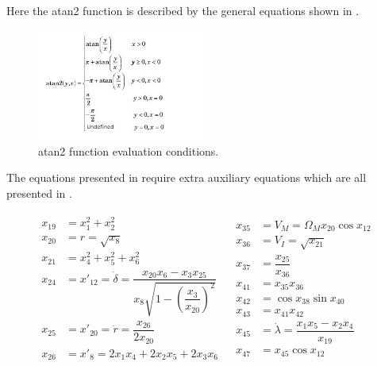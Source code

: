 Here the atan2 function is described by the general equations shown in .

\begin{figure}[!ht]
\centering
\includegraphics[width=0.5\textwidth]{figures/reference_frames/atan2_guilhaire2013.jpg}
\caption{atan2 function evaluation conditions.}
\label{fig:atan2_guilhaire2013}
\end{figure}

The equations presented in  require extra auxiliary equations which are all presented in .
 
 \begin{align} \label{eq:extraTransAnglAux}
\begin{split}
x_{19} &= x_{1}^{2}+x_{2}^{2}\\
x_{20} &= r = \sqrt{x_{8}} \\
x_{21} &= x_{4}^{2}+x_{5}^{2}+x_{6}^{2}\\
x_{24} &= x'_{12} = \dot{\delta} = \dfrac{x_{20}x_{6}-x_{3}x_{25}}{x_{8} \sqrt{1-\left(\dfrac{x_{3}}{x_{20}}\right)^{2}}}\\
x_{25} &= x'_{20}=\dot{r}=\dfrac{x_{26}}{2x_{20}}\\
x_{26} &= x'_{8}=2x_{1}x_{4}+2x_{2}x_{5}+2x_{3}x_{6}\\
\end{split}
&
\begin{split}
x_{35} &= V_{M} = \Omega_{M} x_{20}\cos x_{12}\\
x_{36} &= V_{I} = \sqrt{x_{21}}\\
x_{37} &= \dfrac{x_{25}}{x_{36}}\\
x_{41} &= x_{35}x_{36}\\
x_{42} &= \cos x_{38} \sin x_{40}\\
x_{43} &= x_{41}x_{42}\\
x_{45} &= \dot{\lambda} = \dfrac{x_{1}x_{5}-x_{2}x_{4}}{x_{19}}\\
x_{47} &= x_{45} \cos x_{12} \\
\end{split}
\end{align}  

